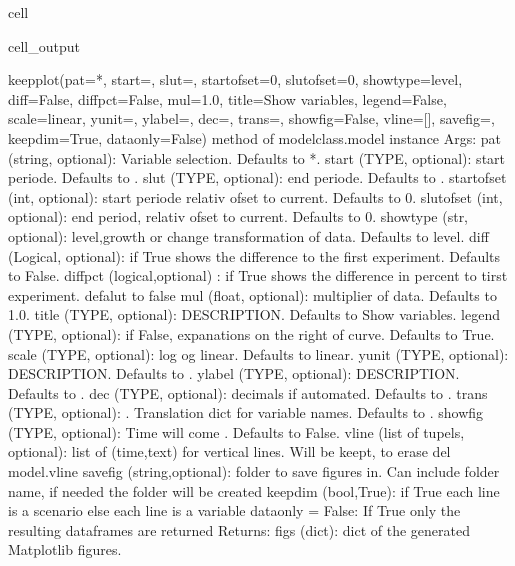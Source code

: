 \documentclass[letterpaper,10pt,english]{jupyterBook}
\begin{document}
\begin{sphinxuseclass}{cell}
\begin{sphinxVerbatimOutput}
\begin{sphinxuseclass}{cell_output}
\begin{sphinxVerbatim}[commandchars=\\\{\}]
keep\PYGZus{}plot(pat=\PYGZsq{}*\PYGZsq{}, start=\PYGZsq{}\PYGZsq{}, slut=\PYGZsq{}\PYGZsq{}, start\PYGZus{}ofset=0, slut\PYGZus{}ofset=0, showtype=\PYGZsq{}level\PYGZsq{}, diff=False, diffpct=False, mul=1.0, title=\PYGZsq{}Show variables\PYGZsq{}, legend=False, scale=\PYGZsq{}linear\PYGZsq{}, yunit=\PYGZsq{}\PYGZsq{}, ylabel=\PYGZsq{}\PYGZsq{}, dec=\PYGZsq{}\PYGZsq{}, trans=\PYGZob{}\PYGZcb{}, showfig=False, vline=[], savefig=\PYGZsq{}\PYGZsq{}, keep\PYGZus{}dim=True, dataonly=False) method of modelclass.model instance
    Args:
        pat (string, optional): Variable selection. Defaults to \PYGZsq{}*\PYGZsq{}.
        start (TYPE, optional): start periode. Defaults to \PYGZsq{}\PYGZsq{}.
        slut (TYPE, optional): end periode. Defaults to \PYGZsq{}\PYGZsq{}.
        start\PYGZus{}ofset (int, optional): start periode relativ ofset to current. Defaults to 0.
        slut\PYGZus{}ofset (int, optional): end period, relativ ofset to current. Defaults to 0.
        showtype (str, optional): \PYGZsq{}level\PYGZsq{},\PYGZsq{}growth\PYGZsq{} or change\PYGZsq{} transformation of data. Defaults to \PYGZsq{}level\PYGZsq{}.
        diff (Logical, optional): if True shows the difference to the first experiment. Defaults to False.
        diffpct (logical,optional) : if True shows the difference in percent to tirst experiment. defalut to false
        mul (float, optional): multiplier of data. Defaults to 1.0.
        title (TYPE, optional): DESCRIPTION. Defaults to \PYGZsq{}Show variables\PYGZsq{}.
        legend (TYPE, optional): if False, expanations on the right of curve. Defaults to True.
        scale (TYPE, optional): \PYGZsq{}log\PYGZsq{} og \PYGZsq{}linear\PYGZsq{}. Defaults to \PYGZsq{}linear\PYGZsq{}.
        yunit (TYPE, optional): DESCRIPTION. Defaults to \PYGZsq{}\PYGZsq{}.
        ylabel (TYPE, optional): DESCRIPTION. Defaults to \PYGZsq{}\PYGZsq{}.
        dec (TYPE, optional): decimals if \PYGZsq{}\PYGZsq{} automated. Defaults to \PYGZsq{}\PYGZsq{}.
        trans (TYPE, optional): . Translation dict for variable names. Defaults to \PYGZob{}\PYGZcb{}.
        showfig (TYPE, optional): Time will come . Defaults to False.
        vline (list of tupels, optional): list of (time,text) for vertical lines. Will be keept, to erase del model.vline
        savefig (string,optional): folder to save figures in. Can include folder name, if needed the folder will be created 
        keep\PYGZus{}dim (bool,True): if True each line is a scenario else each line is a variable 
        dataonly = False: If True only the resulting dataframes are returned 
    Returns:
        figs (dict): dict of the generated Matplotlib figures.
\end{sphinxVerbatim}

\end{sphinxuseclass}\end{sphinxVerbatimOutput}

\end{sphinxuseclass}
\end{document}
